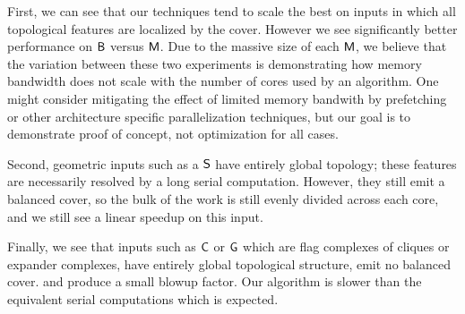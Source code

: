 First, we can see that our techniques tend to scale the best on inputs
in which all topological features are localized by the cover. However we see significantly 
better performance on ${\textsf{B}}$ versus $\textsf{M}$. Due to the massive size
of each $\textsf{M}$, we believe that the variation between these two experiments is 
demonstrating how memory bandwidth does not scale with the number
of cores used by an algorithm. One might consider mitigating the effect of limited memory 
bandwith by prefetching or other architecture specific parallelization
techniques, but our goal is to demonstrate proof of concept, not optimization for all cases.

Second, geometric inputs such as a $\textsf{S}$ have entirely global topology; these
features are necessarily resolved by a long serial computation. However, they still
emit a balanced cover, so the bulk of the work is still evenly divided across each core,
and we still see a linear speedup on this input.
 
Finally, we see that inputs such as $\textsf{C}$ or $\textsf{G}$ which are flag complexes of cliques or
expander complexes, have entirely global topological structure,
emit no balanced cover. and produce a small blowup factor. 
Our algorithm is slower than the equivalent serial computations which
is expected.
